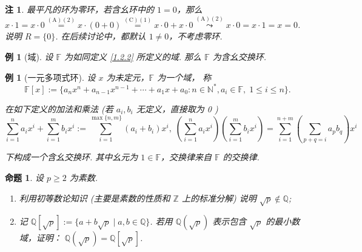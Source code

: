 \documentclass[10pt,openany]{article}
\theoremstyle{thmstyle} %
\theoremstyle{defstyle} %
\theoremstyle{prostyle} %
\newtheorem{proposition}[theorem]{命题}
\theoremstyle{exastyle}
\newtheorem{example}[theorem]{例}
\theoremstyle{remstyle}
\newtheorem{remark}[theorem]{注}
\newcommand{\F}{\mathbb{F}}
\begin{document}
\begin{remark}
	最平凡的环为零环，若含幺环中的 \( 1=0 \)，那么 \( x \cdot 1= x \cdot 0 \overset{(\text{A})(2)}{=} x \cdot (0+0) \overset{(\text{C})(1)}{=} x \cdot 0+ x \cdot 0 \overset{(\text{A})(2)}{\leadsto} x \cdot 0=x \cdot 1=x=0 \). 说明 \( R=\{0\} \). 在后续讨论中，都默认 \( 1 \neq 0 \)，不考虑零环.
\end{remark}

\begin{example}[域]
	设 \( \F \) 为如同定义 \ref{1.2.2} 所定义的域. 那么 \( \F \) 为含幺交换环. 
\end{example}

\begin{example}[一元多项式环]
	设 \( x \) 为未定元，\( \F \) 为一个域， 称
	\[ \F[x]:=\{ a_nx^n+a_{n-1}x^{n-1}+\cdots+a_1x+a_0 : n \in \mathbb{N}^*, a_i \in \F, \; 1 \leq i \leq n \}. \]
	
	在如下定义的加法和乘法 (若 \( a_i, b_i \) 无定义，直接取为 0 )
	\[ \sum_{i=1}^{n} a_ix^i + \sum_{i=1}^{m} b_ix^i:= \sum_{i=1}^{\max\{n,m\}} (a_i+b_i)x^i, \; \left( \sum_{i=1}^{n} a_ix^i \right)\left( \sum_{i=1}^{m} b_ix^i \right)= \sum_{i=1}^{n+m} \left( \sum_{p+q=i}^{} a_pb_q \right) x^i \]
	
	下构成一个含幺交换环. 其中幺元为 \( 1 \in \F \)，交换律来自 \( \F \) 的交换律. 
\end{example}

\begin{proposition}	\label{1.2.12}
	设 \( p \geq 2 \) 为素数.
	\begin{enumerate}[(1)]
		\item 利用初等数论知识 (主要是素数的性质和 \( \mathbb{Z} \) 上的标准分解) 说明 \( \sqrt{p} \notin \mathbb{Q} \);
		\item 记 \( \mathbb{Q}[\sqrt{p}]:=\{ a+b\sqrt{p} \mid a,b \in \mathbb{Q} \} \). 若用 \( \mathbb{Q}(\sqrt{p}) \) 表示包含 \( \sqrt{p} \) 的最小数域，证明： \( \mathbb{Q}(\sqrt{p})=\mathbb{Q}[\sqrt{p}] \).
	\end{enumerate}

\end{proposition}
\end{document}
